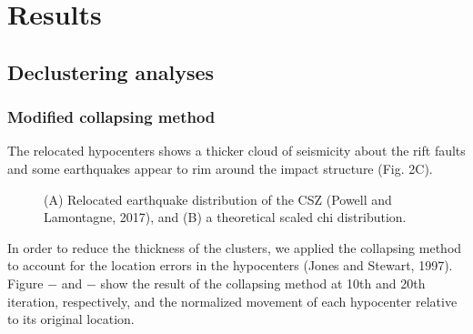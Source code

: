 \documentclass[draft]{agujournal2018}
\begin{document}






\section{Results}

\subsection{Declustering analyses}

\subsubsection{Modified collapsing method}
The relocated hypocenters shows a thicker cloud of seismicity about the rift faults and some earthquakes appear to rim around the impact structure (Fig. 2C).

\begin{figure}[ht]
\centering
\caption{(A) Relocated earthquake distribution of the CSZ (Powell and Lamontagne, 2017), and (B) a theoretical scaled chi distribution.}
\label{figfour}
\end{figure} 

In order to reduce the thickness of the clusters, we applied the collapsing method to account for the location errors in the hypocenters (Jones and Stewart, 1997). Figure $-$ and $-$ show the result of the collapsing method at 10th and 20th iteration, respectively, and the normalized movement of each hypocenter relative to its original location. 
\end{document}
